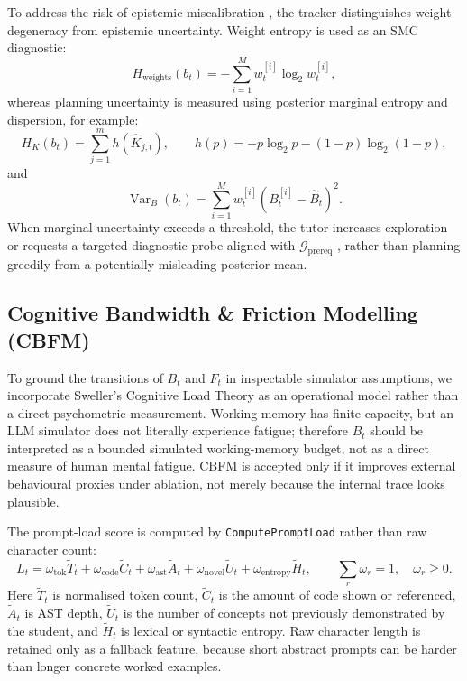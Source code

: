 \documentclass[11pt,a4paper]{report}
\begin{document}
To address the risk of epistemic miscalibration \cite{calibration2026}, the tracker distinguishes weight degeneracy from epistemic uncertainty. Weight entropy is used as an SMC diagnostic:
\begin{equation}
    H_{\text{weights}}(b_t) = -\sum_{i=1}^{M}w_t^{[i]}\log_2 w_t^{[i]},
\end{equation}
whereas planning uncertainty is measured using posterior marginal entropy and dispersion, for example:
\begin{equation}
    H_K(b_t)=\sum_{j=1}^{m}h(\hat{K}_{j,t}), \qquad
    h(p)=-p\log_2 p-(1-p)\log_2(1-p),
\end{equation}
and
\begin{equation}
    \operatorname{Var}_B(b_t)=\sum_{i=1}^{M}w_t^{[i]}(B_t^{[i]}-\hat{B}_t)^2.
\end{equation}
When marginal uncertainty exceeds a threshold, the tutor increases exploration or requests a targeted diagnostic probe aligned with $\mathcal{G}_{\text{prereq}}$ \cite{zeng2025graphmasal}, rather than planning greedily from a potentially misleading posterior mean.


\subsection{Cognitive Bandwidth \& Friction Modelling (CBFM)}
To ground the transitions of $B_t$ and $F_t$ in inspectable simulator assumptions, we incorporate Sweller's Cognitive Load Theory as an operational model rather than a direct psychometric measurement. Working memory has finite capacity, but an LLM simulator does not literally experience fatigue; therefore $B_t$ should be interpreted as a bounded simulated working-memory budget, not as a direct measure of human mental fatigue. CBFM is accepted only if it improves external behavioural proxies under ablation, not merely because the internal trace looks plausible.

The prompt-load score is computed by \texttt{ComputePromptLoad} rather than raw character count:
\begin{equation}
    L_t =
    \omega_{\text{tok}}\tilde{T}_t
    + \omega_{\text{code}}\tilde{C}_t
    + \omega_{\text{ast}}\tilde{A}_t
    + \omega_{\text{novel}}\tilde{U}_t
    + \omega_{\text{entropy}}\tilde{H}_t,
    \qquad
    \sum_r\omega_r=1,\quad \omega_r\ge0.
\end{equation}
Here $\tilde{T}_t$ is normalised token count, $\tilde{C}_t$ is the amount of code shown or referenced, $\tilde{A}_t$ is AST depth, $\tilde{U}_t$ is the number of concepts not previously demonstrated by the student, and $\tilde{H}_t$ is lexical or syntactic entropy. Raw character length is retained only as a fallback feature, because short abstract prompts can be harder than longer concrete worked examples.
\end{document}
